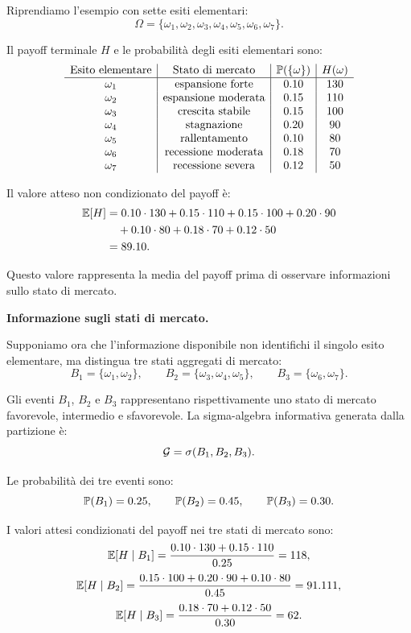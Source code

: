 Riprendiamo l'esempio con sette esiti elementari:
\[
\Omega
=
\{\omega_1,\omega_2,\omega_3,\omega_4,\omega_5,\omega_6,\omega_7\}.
\]

Il payoff terminale $H$ e le probabilit\`{a} degli esiti elementari sono:
\[
\begin{array}{c|c|c|c}
\text{Esito elementare} & \text{Stato di mercato} &
\mathbb{P}(\{\omega\}) & H(\omega) \\
\hline
\omega_1 & \text{espansione forte} & 0.10 & 130 \\
\omega_2 & \text{espansione moderata} & 0.15 & 110 \\
\omega_3 & \text{crescita stabile} & 0.15 & 100 \\
\omega_4 & \text{stagnazione} & 0.20 & 90 \\
\omega_5 & \text{rallentamento} & 0.10 & 80 \\
\omega_6 & \text{recessione moderata} & 0.18 & 70 \\
\omega_7 & \text{recessione severa} & 0.12 & 50 \\
\end{array}
\]

Il valore atteso non condizionato del payoff \`{e}:
\[
\begin{aligned}
\mathbb{E}[H]
&=
0.10\cdot130
+
0.15\cdot110
+
0.15\cdot100
+
0.20\cdot90 \\
&\quad
+
0.10\cdot80
+
0.18\cdot70
+
0.12\cdot50 \\
&=
89.10.
\end{aligned}
\]

Questo valore rappresenta la media del payoff prima di osservare informazioni
sullo stato di mercato.

\medskip

\noindent
\textbf{Informazione sugli stati di mercato.}

Supponiamo ora che l'informazione disponibile non identifichi il singolo esito
elementare, ma distingua tre stati aggregati di mercato:
\[
B_1=\{\omega_1,\omega_2\},
\qquad
B_2=\{\omega_3,\omega_4,\omega_5\},
\qquad
B_3=\{\omega_6,\omega_7\}.
\]

Gli eventi $B_1$, $B_2$ e $B_3$ rappresentano rispettivamente uno stato di
mercato favorevole, intermedio e sfavorevole. La sigma-algebra informativa
generata dalla partizione \`{e}:
\[
\mathcal{G}
=
\sigma(B_1,B_2,B_3).
\]

Le probabilit\`{a} dei tre eventi sono:
\[
\mathbb{P}(B_1)=0.25,
\qquad
\mathbb{P}(B_2)=0.45,
\qquad
\mathbb{P}(B_3)=0.30.
\]

I valori attesi condizionati del payoff nei tre stati di mercato sono:
\[
\mathbb{E}[H\mid B_1]
=
\frac{0.10\cdot130+0.15\cdot110}{0.25}
=
118,
\]
\[
\mathbb{E}[H\mid B_2]
=
\frac{0.15\cdot100+0.20\cdot90+0.10\cdot80}{0.45}
=
91.111,
\]
\[
\mathbb{E}[H\mid B_3]
=
\frac{0.18\cdot70+0.12\cdot50}{0.30}
=
62.
\]

